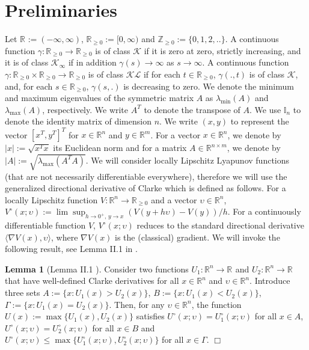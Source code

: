 \documentclass[a4paper, 9pt, twocolumn]{IEEEtran}
\theoremstyle{plain}
\theoremstyle{definition}
\newtheorem{lemma}{Lemma}
\newcommand{\R}[2]{\ensuremath{\mathbb{R}^{#1}_{#2}}}
\newcommand{\Zp}{\ensuremath{\mathbb{Z}_{\geq 0}}}
\newcommand{\K}{\ensuremath{\mathcal{K}}}
\newcommand{\Kinf}{\ensuremath{\mathcal{K}_{\infty}}}
\newcommand{\KL}{\ensuremath{\mathcal{KL}}}
\begin{document}
\section{Preliminaries} \label{sec: preliminaries}
Let $\R{}{} := (-\infty,\infty)$, $\R{}{\geq 0} := [0,\infty)$ and $\Zp := \{ 0, 1, 2, . . \}$. A continuous function $\gamma: \R{}{\geq 0} \rightarrow \R{}{\geq 0}$ is of class $\K$ if it is zero at zero, strictly increasing, and it is of class $\Kinf$ if in addition $\gamma(s) \rightarrow \infty$ as $s \rightarrow \infty$. A continuous function $\gamma: \R{}{\geq 0} \times \R{}{\geq 0} \rightarrow \R{}{\geq 0}$ is of class $\KL$ if for each $t \in \R{}{\geq 0}$, $\gamma(.,t)$ is of class $\K$, and, for each $s \in \R{}{\geq 0}$, $\gamma(s,.)$ is decreasing to zero. We denote the minimum and maximum eigenvalues of the symmetric matrix $A$ as $\lambda_{\min}(A)$ and $\lambda_{\max}(A)$, respectively. We write $A^{T}$ to denote the transpose of $A$. We use $\mathbb{I}_{n}$ to denote the identity matrix of dimension $n$. We write $(x,y)$ to represent the vector $[x^{T}, y^{T}]^{T}$ for $x \in \R{n}{}$ and $y \in \R{m}{}$. For a vector $x\in\R{n}{}$, we denote by $|x|:=\sqrt{x^{T}x}$ its Euclidean norm and for a matrix $A\in\R{n\times m}{}$, we denote by $|A| := \sqrt{\lambda_{\max}(A^{T}A)}$. We will consider locally Lipschitz Lyapunov functions (that are not necessarily differentiable everywhere), therefore we will use the generalized directional derivative of Clarke which is defined as follows. For a locally Lipschitz function $V: \R{n}{} \rightarrow \R{}{\geq 0}$ and a vector $\upsilon \in \R{n}{}$, $V^{\circ}(x;\upsilon) := \lim \sup_{h \to 0^{+}, \, y \to x}(V(y+h\upsilon) - V(y))/h$. For a continuously differentiable function $V$, $V^{\circ}(x;\upsilon)$ reduces to the standard directional derivative $\langle\nabla V(x), \upsilon\rangle$, where $\nabla V(x)$ is the (classical) gradient. We will invoke the following result, see Lemma II.1 in \cite{Liberzon2012Lyapunov}.

\begin{lemma}[Lemma II.1 \cite{Liberzon2012Lyapunov}] \label{lma: clarke}
Consider two functions $U_{1}: \R{n}{} \rightarrow \R{}{}$ and $U_{2}: \R{n}{} \rightarrow \R{}{}$ that have well-defined Clarke derivatives for all $x\in\R{n}{}$ and $\upsilon \in \R{n}{}$. Introduce three sets $A:=\{ x: U_{1}(x) > U_{2}(x) \}$, $B:=\{ x: U_{1}(x) < U_{2}(x) \}$, $\Gamma:= \{ x: U_{1}(x) = U_{2}(x) \}$. Then, for any $\upsilon \in \R{n}{}$, the function $U(x) := \max\{U_{1}(x), U_{2}(x)\}$ satisfies $U^{\circ}(x; \upsilon) = U_{1}^{\circ}(x;\upsilon)$ for all $x\in A$, $U^{\circ}(x; \upsilon) = U_{2}^{\circ}(x;\upsilon)$ for all $x\in B$ and $U^{\circ}(x; \upsilon) \leq \max\{U_{1}^{\circ}(x;\upsilon), U_{2}^{\circ}(x;\upsilon)\}$ for all $x\in \Gamma$. \hfill $\Box$
\end{lemma}
\end{document}

